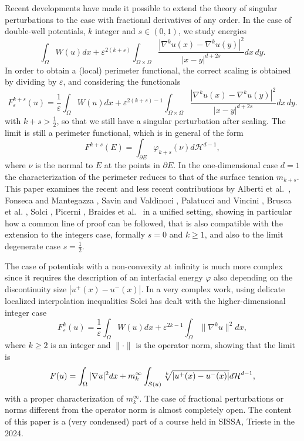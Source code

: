\documentclass{article}
\newcommand{\e}{\varepsilon}
\begin{document}
\smallskip
Recent developments have made it possible to extend the theory  of singular perturbations to the case with fractional derivatives of any order. In the case of double-well potentials, $k$ integer and $s\in (0,1)$, we study energies
\begin{equation}\label{m+k-0}
\int_\Omega W(u)dx+ \e^{2(k+s)} \int_{\Omega\times \Omega}\frac{|\nabla^{k}u(x)-\nabla^{k}u(y)|^2}{|x-y|^{d+2s}}dx\,dy.
\end{equation}
In order to obtain a (local) perimeter functional, the correct scaling is obtained by dividing by $\e$, and considering the functionals 
\begin{equation}\label{m+k}
F^{k+s}_\e(u)=\frac1\e\int_\Omega W(u)dx+ \e^{2(k+s)-1} \int_{\Omega\times \Omega}\frac{|\nabla^{k}u(x)-\nabla^{k}u(y)|^2}{|x-y|^{d+2s}}dx\,dy.
\end{equation}
with $k+s>\frac12$, so that we still have a singular perturbation after scaling.
The limit is still a perimeter functional, which is in general of the form
\begin{equation}\label{m+k-limit}
F^{k+s}(E)=\int_{\partial E}\varphi_{k+s}(\nu)d\mathcal H^{d-1},
\end{equation}
where $\nu$ is the normal to $E$ at the points in $\partial E$. In the one-dimensional case $d=1$ the characterization of the perimeter reduces to that of the surface tension $m_{k+s}$. This paper examines the recent and less recent contributions by Alberti et al.~\cite{ABS}, Fonseca and Mantegazza \cite{FM}, Savin and Valdinoci \cite{SV}, Palatucci and Vincini \cite{PaVi}, Brusca et al. \cite{BDS}, Solci \cite{Solci}, Picerni \cite{Picerni}, Braides et al.~\cite{BOP} in a unified setting, showing in particular how a common line of proof can be followed, that is also compatible with the extension to the integers case, formally $s=0$ and $k\ge 1$, and also to the limit degenerate case $s=\frac12$. 

The case of potentials with a non-convexity at infinity is much more complex since it requires the description of an interfacial energy $\varphi$ also depending on the discontinuity size $|u^+(x)-u^-(x)|$. In a very complex work, using delicate localized interpolation inequalities Solci \cite{MR4937467} has dealt with the higher-dimensional integer case  
\begin{equation}\label{m+k}
F^{k}_\e(u)=\frac1\e\int_\Omega W(u)dx+ \e^{2k-1} \int_{\Omega} \|\nabla^{k}u\|^2dx,
\end{equation}
where $k\ge 2$ is an integer and $\|\cdot\|$ is the operator norm, showing that the limit is 
\begin{equation}\label{4}
F(u)=\int_\Omega |\nabla u|^2 dx+ m^\infty_k \int_{S(u)}\root k \of {|u^+(x)-u^-(x)|}d\mathcal H^{d-1},
\end{equation}
with a proper characterization of $m^\infty_k$. The case of fractional perturbations or norms different from the operator norm is almost completely open.
The content of this paper is a (very condensed) part of a course held in SISSA, Trieste in the 2024. 
\end{document}
